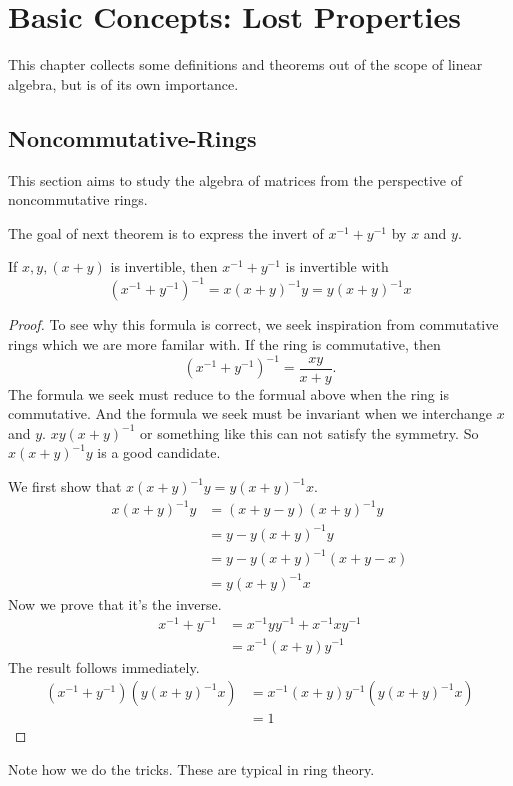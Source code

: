 
\chapter{Basic Concepts: Lost Properties}
This chapter collects some definitions and theorems out of the scope of linear algebra, but is of its own importance.
\section{Noncommutative-Rings}
This section aims to study the algebra of matrices from the perspective of noncommutative rings. \par
The goal of next theorem is to express the invert of $x^{-1}+y^{-1}$ by $x$ and $y$. 
\begin{theorem}
If $x,y,(x+y)$ is invertible, then $x^{-1}+y^{-1}$ is invertible with 
\[(x^{-1}+y^{-1})^{-1}=x(x+y)^{-1}y=y(x+y)^{-1}x\]
\end{theorem}
\begin{proof}
  To see why this formula is correct, we seek inspiration from commutative rings which we are more familar with. 
  If the ring is commutative, then \[(x^{-1}+y^{-1})^{-1}=\frac{xy}{x+y}.\] 
  The formula we seek must reduce to the formual above when the ring is commutative. And the formula we seek must be invariant when we interchange $x$ and $y$. $xy(x+y)^{-1}$ or something like this can not satisfy the symmetry. So $x(x+y)^{-1}y$ is a good candidate.\par
We first show that $x(x+y)^{-1}y=y(x+y)^{-1}x$. 
\begin{align*}
x(x+y)^{-1}y&=(x+y-y)(x+y)^{-1}y\\&=y-y(x+y)^{-1}y\\&=y-y(x+y)^{-1}(x+y-x)\\&=y(x+y)^{-1}x
\end{align*}
Now we prove that it's the inverse.
\begin{align*}
x^{-1}+y^{-1}&=x^{-1}yy^{-1}+x^{-1}xy^{-1}\\&=x^{-1}(x+y)y^{-1}
\end{align*}
The result follows immediately.
\begin{align*}
(x^{-1}+y^{-1})(y(x+y)^{-1}x)&=x^{-1}(x+y)y^{-1}(y(x+y)^{-1}x)\\&=1
\end{align*}
\end{proof}
\begin{remark}
Note how we do the tricks. These are typical in ring theory.
\end{remark}

